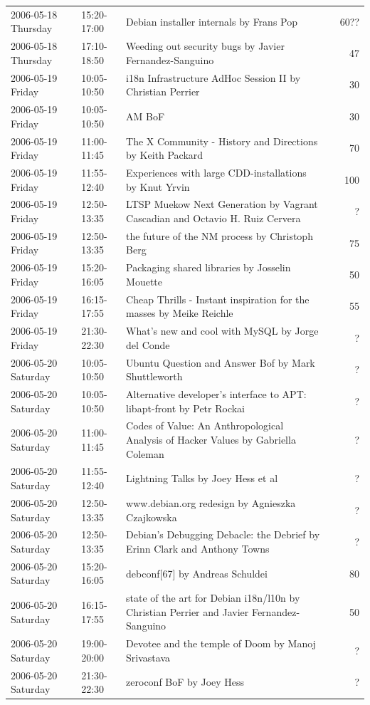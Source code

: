 \documentclass[mingoth,a4paper]{jsarticle}
\begin{document}
\begin{minipage}[t]{0.7\hsize}
\begin{center}
{\begin{tabular}{|l|l|p{20em}|r|}
 2006-05-18 Thursday & 15:20-17:00 & Debian installer internals by Frans Pop &  ~~60?? \\
 2006-05-18 Thursday & 17:10-18:50 & Weeding out security bugs by Javier Fernandez-Sanguino &  47 \\
 2006-05-19 Friday & 10:05-10:50 & i18n Infrastructure AdHoc Session II by Christian Perrier &  ~30 \\
 2006-05-19 Friday & 10:05-10:50 & AM BoF &  30 \\
 2006-05-19 Friday & 11:00-11:45 & The X Community - History and Directions by Keith Packard &  70 \\
 2006-05-19 Friday & 11:55-12:40 & Experiences with large CDD-installations by Knut Yrvin &  ~100 \\
 2006-05-19 Friday & 12:50-13:35 & LTSP Muekow Next Generation by Vagrant Cascadian and Octavio H. Ruiz Cervera &  ? \\
 2006-05-19 Friday & 12:50-13:35 & the future of the NM process by Christoph Berg &  ~75 \\
 2006-05-19 Friday & 15:20-16:05 & Packaging shared libraries by Josselin Mouette &  ~50 \\
 2006-05-19 Friday & 16:15-17:55 & Cheap Thrills - Instant inspiration for the masses by Meike Reichle &  55 \\
 2006-05-19 Friday & 21:30-22:30 & What's new and cool with MySQL by Jorge del Conde &  ? \\
 2006-05-20 Saturday & 10:05-10:50 & Ubuntu Question and Answer Bof by Mark Shuttleworth &  ? \\
 2006-05-20 Saturday & 10:05-10:50 & Alternative developer's interface to APT: libapt-front by Petr Rockai &  ? \\
 2006-05-20 Saturday & 11:00-11:45 & Codes of Value: An Anthropological Analysis of Hacker Values by Gabriella Coleman &  ? \\
 2006-05-20 Saturday & 11:55-12:40 & Lightning Talks by Joey Hess et al &  ? \\
 2006-05-20 Saturday & 12:50-13:35 & www.debian.org redesign by Agnieszka Czajkowska &  ? \\
 2006-05-20 Saturday & 12:50-13:35 & Debian's Debugging Debacle: the Debrief by Erinn Clark and Anthony Towns &  ? \\
 2006-05-20 Saturday & 15:20-16:05 & debconf[67] by Andreas Schuldei &  80 \\
 2006-05-20 Saturday & 16:15-17:55 & state of the art for Debian i18n/l10n by Christian Perrier and Javier Fernandez-Sanguino &  50 \\
 2006-05-20 Saturday & 19:00-20:00 & Devotee and the temple of Doom by Manoj Srivastava &  ? \\
 2006-05-20 Saturday & 21:30-22:30 & zeroconf BoF by Joey Hess &  ? \\
\hline
 \end{tabular}
 }
 \end{center}
\end{minipage}
\end{document}
